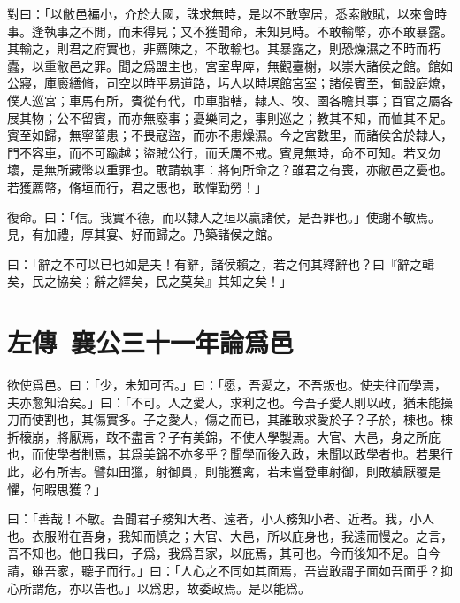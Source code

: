 對曰：「以敝邑褊小，介於大國，誅求無時，是以不敢寧居，悉索敝賦，以來會時事。逢執事之不閒，而未得見；又不獲聞命，未知見時。不敢輸幣，亦不敢暴露。其輸之，則君之府實也，非薦陳之，不敢輸也。其暴露之，則恐燥濕之不時而朽蠹，以重敝邑之罪。聞之爲盟主也，宮室卑庳，無觀臺榭，以崇大諸侯之館。館如公寢，庫廄繕脩，司空以時平易道路，圬人以時塓館宮室；諸侯賓至，甸設庭燎，僕人巡宮；車馬有所，賓從有代，巾車脂轄，隸人、牧、圉各瞻其事；百官之屬各展其物；公不留賓，而亦無廢事；憂樂同之，事則巡之；教其不知，而恤其不足。賓至如歸，無寧菑患；不畏寇盜，而亦不患燥濕。今之宮數里，而諸侯舍於隸人，門不容車，而不可踰越；盜賊公行，而夭厲不戒。賓見無時，命不可知。若又勿壞，是無所藏幣以重罪也。敢請執事：將何所命之？雖君之有喪，亦敝邑之憂也。若獲薦幣，脩垣而行，君之惠也，敢憚勤勞！」

復命。曰：「信。我實不德，而以隸人之垣以贏諸侯，是吾罪也。」使謝不敏焉。見，有加禮，厚其宴、好而歸之。乃築諸侯之館。

曰：「辭之不可以已也如是夫！有辭，諸侯賴之，若之何其釋辭也？曰『辭之輯矣，民之協矣；辭之繹矣，民之莫矣』其知之矣！」

\section[子產論尹何爲邑\quad{\small 左傳\ 襄公三十一年}]{{\normalsize 左傳\ 襄公三十一年}\quad {}論爲邑}
欲使爲邑。曰：「少，未知可否。」曰：「愿，吾愛之，不吾叛也。使夫往而學焉，夫亦愈知治矣。」曰：「不可。人之愛人，求利之也。今吾子愛人則以政，猶未能操刀而使割也，其傷實多。子之愛人，傷之而已，其誰敢求愛於子？子於，棟也。棟折榱崩，將厭焉，敢不盡言？子有美錦，不使人學製焉。大官、大邑，身之所庇也，而使學者制焉，其爲美錦不亦多乎？聞學而後入政，未聞以政學者也。若果行此，必有所害。譬如田獵，射御貫，則能獲禽，若未嘗登車射御，則敗績厭覆是懼，何暇思獲？」

曰：「善哉！不敏。吾聞君子務知大者、遠者，小人務知小者、近者。我，小人也。衣服附在吾身，我知而慎之；大官、大邑，所以庇身也，我遠而慢之。之言，吾不知也。他日我曰，子爲，我爲吾家，以庇焉，其可也。今而後知不足。自今請，雖吾家，聽子而行。」曰：「人心之不同如其面焉，吾豈敢謂子面如吾面乎？抑心所謂危，亦以告也。」以爲忠，故委政焉。是以能爲。

